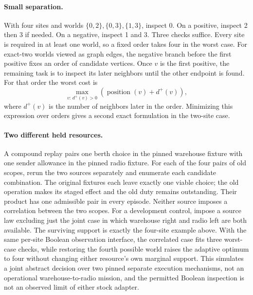 \documentclass[11pt]{article}
\begin{document}
\paragraph{Small separation.}
With four sites and worlds $\{0,2\},\{0,3\},\{1,3\}$, inspect 0. On a positive, inspect 2 then 3 if needed. On a negative, inspect 1 and 3. Three checks suffice. Every site is required in at least one world, so a fixed order takes four in the worst case. For exact-two worlds viewed as graph edges, the negative branch before the first positive fixes an order of candidate vertices. Once $v$ is the first positive, the remaining task is to inspect its later neighbors until the other endpoint is found. For that order the worst cost is
\[
 \max_{v:\,d^+(v)>0}(\operatorname{position}(v)+d^+(v)),
\]
where $d^+(v)$ is the number of neighbors later in the order. Minimizing this expression over orders gives a second exact formulation in the two-site case.

\paragraph{Two different held resources.}
A compound replay pairs one berth choice in the pinned warehouse fixture with one sender allowance in the pinned radio fixture. For each of the four pairs of old scopes, rerun the two sources separately and enumerate each candidate combination. The original fixtures each leave exactly one viable choice; the old operation makes its staged effect and the old duty remains outstanding. Their product has one admissible pair in every episode. Neither source imposes a correlation between the two scopes. For a development control, impose a source law excluding just the joint case in which warehouse right and radio left are both available. The surviving support is exactly the four-site example above. With the same per-site Boolean observation interface, the correlated case fits three worst-case checks, while restoring the fourth possible world raises the adaptive optimum to four without changing either resource's own marginal support. This simulates a joint abstract decision over two pinned separate execution mechanisms, not an operational warehouse-to-radio mission, and the permitted Boolean inspection is not an observed limit of either stock adapter.
\end{document}
